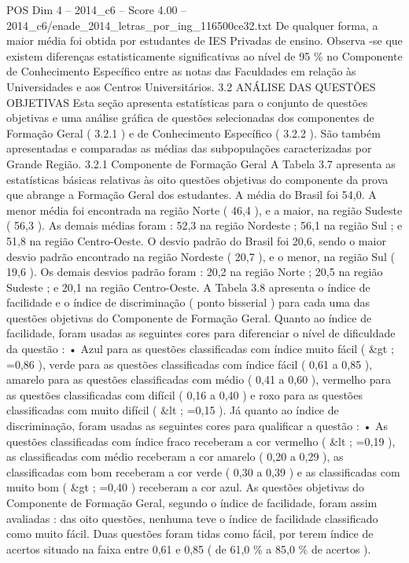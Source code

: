 \begin{textsample}{POS Dim 4 – 2014\_c6 – Score 4.00 – 2014\_c6/enade\_2014\_letras\_por\_ing\_116500ce32.txt}
De qualquer forma, a maior média foi obtida por estudantes de IES Privadas de ensino.
Observa -se que existem diferenças estatisticamente significativas ao nível de 95 \% no Componente de Conhecimento Específico entre as notas das Faculdades em relação às Universidades e aos Centros Universitários. 3.2 ANÁLISE DAS QUESTÕES OBJETIVAS Esta seção apresenta estatísticas para o conjunto de questões objetivas e uma análise gráfica de questões selecionadas dos componentes de Formação Geral ( 3.2.1 ) e de Conhecimento Específico ( 3.2.2 ).
São também apresentadas e comparadas as médias das subpopulações caracterizadas por Grande Região. 3.2.1 Componente de Formação Geral A Tabela 3.7 apresenta as estatísticas básicas relativas às oito questões objetivas do componente da prova que abrange a Formação Geral dos estudantes.
A média do Brasil foi 54,0.
A menor média foi encontrada na região Norte ( 46,4 ), e a maior, na região Sudeste ( 56,3 ).
As demais médias foram : 52,3 na região Nordeste ; 56,1 na região Sul ; e 51,8 na região Centro-Oeste.
O desvio padrão do Brasil foi 20,6, sendo o maior desvio padrão encontrado na região Nordeste ( 20,7 ), e o menor, na região Sul ( 19,6 ).
Os demais desvios padrão foram : 20,2 na região Norte ; 20,5 na região Sudeste ; e 20,1 na região Centro-Oeste.
A Tabela 3.8 apresenta o índice de facilidade e o índice de discriminação ( ponto bisserial ) para cada uma das questões objetivas do Componente de Formação Geral.
Quanto ao índice de facilidade, foram usadas as seguintes cores para diferenciar o nível de dificuldade da questão : • Azul para as questões classificadas com índice muito fácil ( \&gt ; =0,86 ), verde para as questões classificadas com índice fácil ( 0,61 a 0,85 ), amarelo para as questões classificadas com médio ( 0,41 a 0,60 ), vermelho para as questões classificadas com difícil ( 0,16 a 0,40 ) e roxo para as questões classificadas com muito difícil ( \&lt ; =0,15 ).
Já quanto ao índice de discriminação, foram usadas as seguintes cores para qualificar a questão : • As questões classificadas com índice fraco receberam a cor vermelho ( \&lt ; =0,19 ), as classificadas com médio receberam a cor amarelo ( 0,20 a 0,29 ), as classificadas com bom receberam a cor verde ( 0,30 a 0,39 ) e as classificadas com muito bom ( \&gt ; =0,40 ) receberam a cor azul.
As questões objetivas do Componente de Formação Geral, segundo o índice de facilidade, foram assim avaliadas : das oito questões, nenhuma teve o índice de facilidade classificado como muito fácil.
Duas questões foram tidas como fácil, por terem índice de acertos situado na faixa entre 0,61 e 0,85 ( de 61,0 \% a 85,0 \% de acertos ).

\end{textsample}
